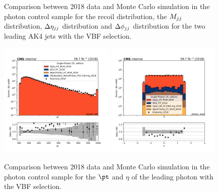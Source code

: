 \begin{figure}[htbp]
\begin{center}
    \end{center}
    \caption{Comparison between 2018 data and Monte Carlo simulation in the photon control sample for
        the recoil distribution, the $M_{jj}$ distribution, $\Delta \eta_{jj}$ distribution and $\Delta \phi_{jj}$ distribution
        for the two leading AK4 jets with the VBF selection.}
    \label{fig:Photon_vbfhinv_2018}
\end{figure}

\begin{figure}[htbp]
    \begin{center}
        \includegraphics[width=0.49\textwidth]{fig/datamc/cr_g_vbf/cr_g_vbf_photon_pt0_losf_2018.pdf}
        \includegraphics[width=0.49\textwidth]{fig/datamc/cr_g_vbf/cr_g_vbf_photon_eta0_losf_2018.pdf}
    \end{center}
    \caption{Comparison between 2018 data and Monte Carlo simulation in the photon control sample for
        the $\pt$ and $\eta$ of the leading photon with the VBF selection.}
    \label{fig:Photon2_vbfhinv_2018}
\end{figure}

